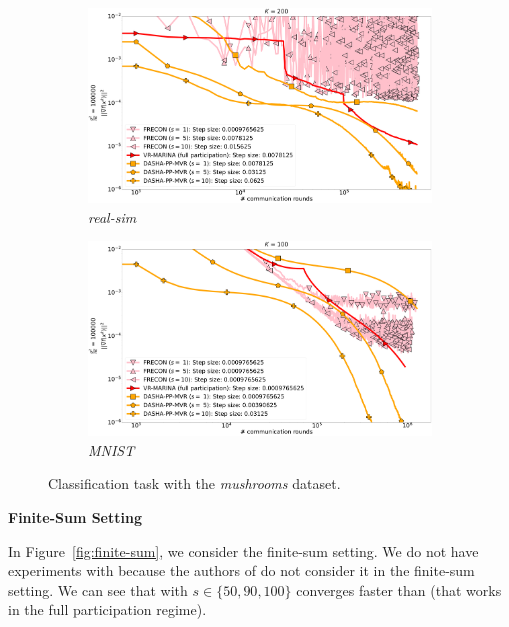 \documentclass[12pt]{article}
\begin{document}
\begin{figure}[H]
    \begin{subfigure}{.5\textwidth}
        \includegraphics[width=\textwidth]{neurips_2022_stochastic_real-sim_nof_200_numnodes_10_probs_mega_batch_100000_fix_nm_bug.pdf}
        \caption{\textit{real-sim}}
    \end{subfigure}
    \begin{subfigure}{.5\textwidth}
        \includegraphics[width=\textwidth]{neurips_2023_stochastic_mnist_nof_100_numnodes_10_probs_mega_batch_100000_batch_size_10_longer.pdf}
        \caption{\textit{MNIST}}
    \end{subfigure}
\caption{Classification task with the \textit{mushrooms} dataset.}
\label{fig:stochastic}
\end{figure}

\begin{center}
    \bf Finite-Sum Setting
\end{center}
In Figure~\ref{fig:finite-sum}, we consider the finite-sum setting. We do not have experiments with  because the authors of  do not consider it in the finite-sum setting. We can see that  with $s \in \{50, 90, 100\}$ converges faster than  (that works in the full participation regime).
\end{document}
